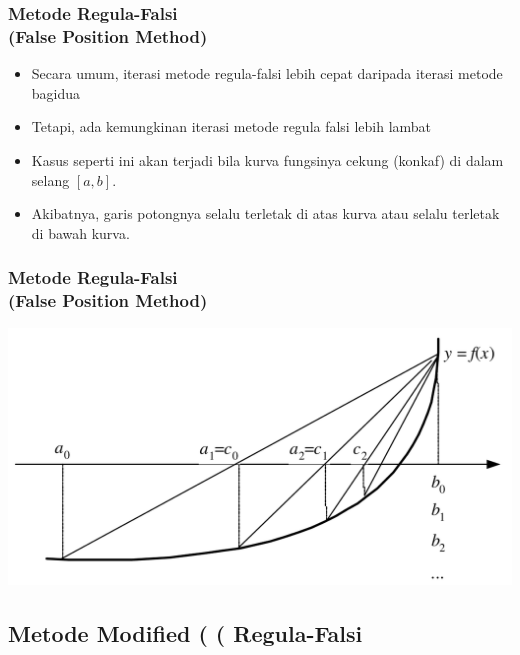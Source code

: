 \documentclass[pdflatex,compress]{beamer}
\begin{document}
\begin{frame}
	\frametitle{Metode Regula-Falsi\\(False Position Method)}
	\begin{itemize}
		\item Secara umum, iterasi metode regula-falsi lebih cepat daripada iterasi metode bagidua
		\item Tetapi, ada kemungkinan iterasi metode regula falsi lebih lambat
		\item Kasus seperti ini akan terjadi bila kurva fungsinya cekung (konkaf) di dalam selang $ [a, b] $.
		\item Akibatnya, garis potongnya selalu terletak di atas kurva atau selalu terletak di bawah kurva.
	\end{itemize}
\end{frame}

\begin{frame}
	\frametitle{Metode Regula-Falsi\\(False Position Method)}
	\begin{center}
		\includegraphics[width=0.6\linewidth]{img/img11}
	\end{center}
\end{frame}

\subsection{Metode Modified \left( \left( Regula-Falsi}
\end{document}
